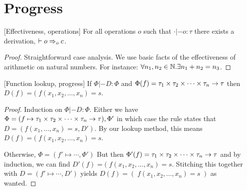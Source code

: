 \documentclass[a4paper, oneside, 10pt, draft]{memoir}
\begin{document}
\section{Progress}

\begin{lem}{[Effectiveness, operations]}
  \label{lem:can-step-op}
  For all operations $o$ such that $\cdot |- o : \tau$ there exists a
  derivation, $|- o =>_{o} c$.
\end{lem}
\begin{proof}
  Straightforward case analysis. We use basic facts of the
  effectiveness of arithmetic on natural numbers. For instance:
  $\forall n_1, n_2 \in \mathbb{N} . \exists n_1 + n_2 = n_3$.
\end{proof}

\begin{lem}{[Function lookup, progress]}
  \label{lem:phi-lookup-good}
  If $\Phi |- D : \Phi$ and $\Phi(f) = \tau_1 \times \tau_2 \times \dotsb \times \tau_n -> \tau$ then $D(f) = (\; f(x_1,
  x_2, \dotsc, x_n) = s$.
\end{lem}
\begin{proof}
  Induction on $\Phi |- D : \Phi$. Either we have $\Phi = (f \mapsto
  \tau_1 \times \tau_2 \times \dotsb \times \tau_n -> \tau),\Phi'$ in which case the rule states that $D = (f(x_1,
  \dotsc, x_n) = s, D')$. By our lookup method, this means $D(f) = (\; f(x_1,
  x_2, \dotsc, x_n) = s$.

  Otherwise, $\Phi = (f' \mapsto \dotsb, \Phi')$ But then $\Phi'(f) =
  \tau_1 \times \tau_2 \times \dotsb \times \tau_n -> \tau$ and by induction, we can find $D'(f) = (\; f(x_1,
  x_2, \dotsc, x_n) = s$. Stitching this together with $D = (f'
  \mapsto \dotsb, D')$ yields $D(f) = (\; f(x_1,  x_2, \dotsc, x_n) =
  s \; )$ as wanted.
\end{proof}
\end{document}
